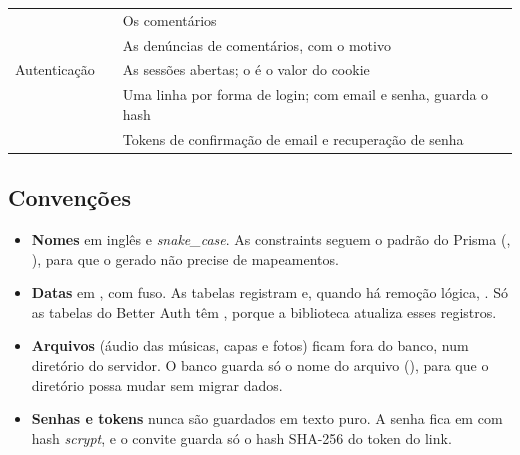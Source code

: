 \begin{table}[htbp]
\begin{tabularx}{\textwidth}{@{}L{0.6}L{0.9}L{1.5}@{}}
     &  & Os comentários \\
     &  & As denúncias de comentários, com o motivo \\
    \midrule
    Autenticação &  & As sessões abertas; o  é o valor do cookie \\
     &  & Uma linha por forma de login; com email e senha, guarda o hash \\
     &  & Tokens de confirmação de email e recuperação de senha \\
    \bottomrule
  \end{tabularx}
\end{table}

\FloatBarrier
\subsection{Convenções}

\begin{itemize}
  \item \textbf{Nomes} em inglês e \emph{snake\_case}. As constraints seguem o
    padrão do Prisma (, ),
    para que o  gerado não precise de mapeamentos.
  \item \textbf{Datas} em , com fuso. As tabelas registram
     e, quando há remoção lógica, . Só
    as tabelas do Better Auth têm , porque a biblioteca
    atualiza esses registros.
  \item \textbf{Arquivos} (áudio das músicas, capas e fotos) ficam fora do
    banco, num diretório do servidor. O banco guarda só o nome do arquivo
    (), para que o diretório possa mudar sem migrar dados.
  \item \textbf{Senhas e tokens} nunca são guardados em texto puro. A senha
    fica em  com hash \emph{scrypt}, e o convite
    guarda só o hash SHA-256 do token do link.
\end{itemize}
